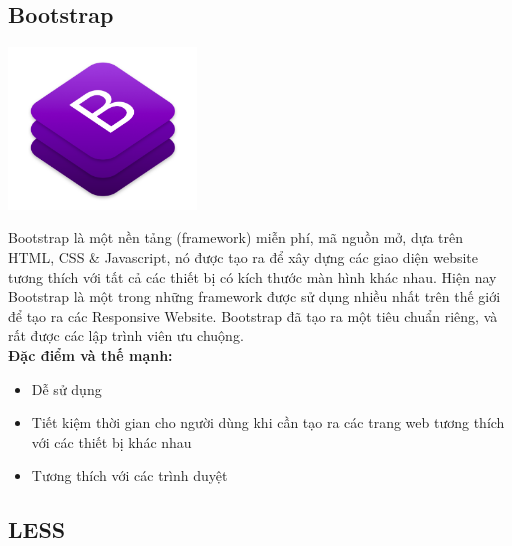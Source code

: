 \subsection{Bootstrap}
\begin{center}
  \captionsetup{type=figure}
  \includegraphics[width=5cm]{img/bootstrap-logo.png}
\end{center}

Bootstrap là một nền tảng (framework) miễn phí, mã nguồn mở, dựa trên HTML, CSS \& Javascript, nó được tạo ra để xây dựng các giao diện website tương thích với tất cả các thiết bị có kích thước màn hình khác nhau.
Hiện nay Bootstrap là một trong những framework được sử dụng nhiều nhất trên thế giới để tạo ra các Responsive Website. Bootstrap đã tạo ra một tiêu chuẩn riêng, và rất được các lập trình viên ưu chuộng.\\

\textbf{Đặc điểm và thế mạnh:}
\begin{itemize}
    \item Dễ sử dụng
    \item Tiết kiệm thời gian cho người dùng khi cần tạo ra các trang web tương thích với các thiết bị khác nhau
    \item Tương thích với các trình duyệt
\end{itemize}

\subsection{LESS}
\begin{center}
  \captionsetup{type=figure}
  
\end{center}

